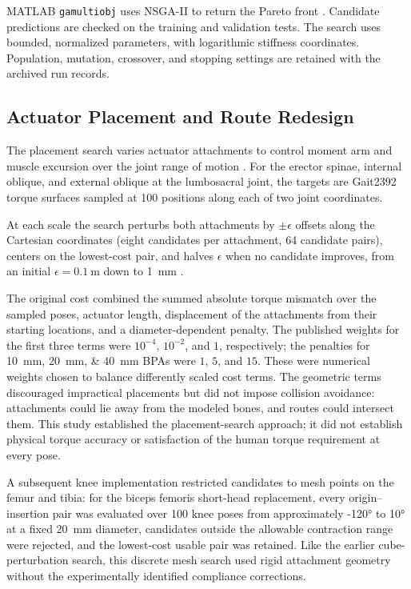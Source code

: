 MATLAB \texttt{gamultiobj} uses NSGA-II to return the Pareto front \citep{deb_nsga2_2002, mathworks_optimization_2025}. Candidate predictions are checked on the training and validation tests. The search uses bounded, normalized parameters, with logarithmic stiffness coordinates. Population, mutation, crossover, and stopping settings are retained with the archived run records.

\subsection{Actuator Placement and Route Redesign}\label{sec:mesh_opt}\label{sec:optimization}

The placement search varies actuator attachments to control moment arm and muscle excursion over the joint range of motion \citep{bolen_determination_2019,morrow_optimization_2020}. For the erector spinae, internal oblique, and external oblique at the lumbosacral joint, the targets are Gait2392 torque surfaces sampled at 100 positions along each of two joint coordinates.

At each scale the search perturbs both attachments by $\pm\epsilon$ offsets along the Cartesian coordinates (eight candidates per attachment, 64 candidate pairs), centers on the lowest-cost pair, and halves $\epsilon$ when no candidate improves, from an initial $\epsilon=\qty{0.1}{\m}$ down to \qty{1}{\mm} \citep{morrow_optimization_2020}.

The original cost combined the summed absolute torque mismatch over the sampled poses, actuator length, displacement of the attachments from their starting locations, and a diameter-dependent penalty. The published weights for the first three terms were $10^{-4}$, $10^{-2}$, and $1$, respectively; the penalties for \qtylist{10;20;40}{\mm} BPAs were $1$, $5$, and $15$. These were numerical weights chosen to balance differently scaled cost terms. The geometric terms discouraged impractical placements but did not impose collision avoidance: attachments could lie away from the modeled bones, and routes could intersect them. This study established the placement-search approach; it did not establish physical torque accuracy or satisfaction of the human torque requirement at every pose.

A subsequent knee implementation restricted candidates to mesh points on the femur and tibia: for the biceps femoris short-head replacement, every origin--insertion pair was evaluated over 100 knee poses from approximately \ang{-120} to \ang{10} at a fixed \qty{20}{\mm} diameter, candidates outside the allowable contraction range were rejected, and the lowest-cost usable pair was retained. Like the earlier cube-perturbation search, this discrete mesh search used rigid attachment geometry without the experimentally identified compliance corrections.

